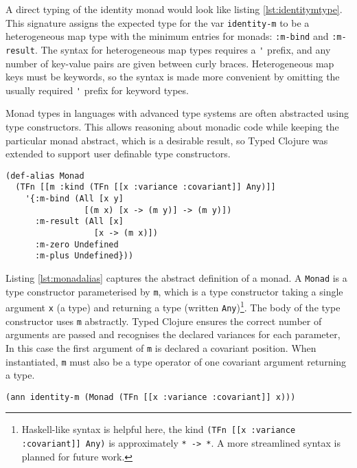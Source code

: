 A direct typing of the identity monad would look like listing \ref{lst:identitymtype}.
This signature assigns the expected type for the var \lstinline|identity-m| 
to be a heterogeneous map type with the minimum entries for monads: \lstinline|:m-bind|
and \lstinline|:m-result|. The syntax for heterogeneous map types requires a \lstinline|'| prefix,
and any number of key-value pairs are given between curly braces. Heterogeneous map keys must be keywords,
so the syntax is made more convenient by omitting the usually required \lstinline|'| prefix
for keyword types.

Monad types in languages with advanced type systems are often abstracted using type constructors.
This allows reasoning about monadic code while keeping the particular monad abstract, which is a desirable result,
so Typed Clojure was extended to support user definable type constructors.

\begin{lstlisting}[caption=An abstract definition of a monad., label=lst:monadalias]
(def-alias Monad 
  (TFn [[m :kind (TFn [[x :variance :covariant]] Any)]]
    '{:m-bind (All [x y]
                [(m x) [x -> (m y)] -> (m y)])
      :m-result (All [x]
                  [x -> (m x)])
      :m-zero Undefined
      :m-plus Undefined}))
\end{lstlisting}

Listing \ref{lst:monadalias} captures the abstract definition of a monad.
A \lstinline|Monad| is a type constructor parameterised by \lstinline|m|, which is
a type constructor taking a single argument \lstinline|x| (a type) and returning a type 
(written \lstinline|Any|)\footnote{Haskell-like syntax is helpful here, the kind \lstinline|(TFn [[x :variance :covariant]] Any)|
is approximately \lstinline|* -> *|. A more streamlined syntax is planned for future work.}.
The body of the type constructor uses \lstinline|m| abstractly. Typed Clojure
ensures the correct number of arguments are passed and recognises the declared variances
for each parameter, In this case the first argument of \lstinline|m| is declared
a covariant position. When instantiated, \lstinline|m| must also be a type operator
of one covariant argument returning a type.

\begin{lstlisting}[caption=Identity monad using user defined type constructors, label=lst:identityctors]
(ann identity-m (Monad (TFn [[x :variance :covariant]] x)))
\end{lstlisting}

